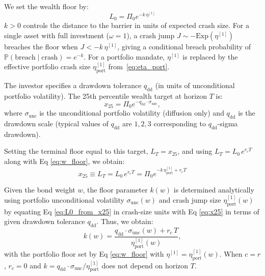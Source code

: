 \documentclass[11pt,a4paper]{article}
\numberwithin{equation}{section}
\newcommand{\Prob}{\mathbb{P}}
\begin{document}
We set the wealth floor by:
\begin{equation}\label{eq:w_floor}
L_0 = \Pi_0 e^{-k\,\eta^{[1]}}
\end{equation}
$k > 0$ controls the distance to the barrier in units of expected 
crash size. For a single asset with full investment ($\omega = 1$), 
a crash jump $J \sim -\mathrm{Exp}(\eta^{[1]})$ breaches the floor 
when $J < -k\,\eta^{[1]}$, giving a conditional breach probability 
of $\Prob(\text{breach} \mid \text{crash}) = e^{-k}$. For a portfolio 
mandate, $\eta^{[1]}$ is replaced by the effective portfolio crash 
size $\eta^{[1]}_{\mathrm{port}}$ from~\eqref{eq:eta_port}. 



The investor specifies a drawdown tolerance $q_{\mathrm{dd}}$ (in units of 
unconditional portfolio volatility). The 25th percentile wealth target at 
horizon $T$ is:
\begin{equation}\label{eq:x25}
x_{25} = \Pi_0 e^{-q_{\mathrm{dd}} \cdot \sigma_{\mathrm{unc}}},
\end{equation}
where $\sigma_{\mathrm{unc}}$ is the unconditional portfolio volatility 
(diffusion only) and $q_{\mathrm{dd}}$ is the drawdown scale (typical values of $q_{\mathrm{dd}}$ are $1, 2, 3$ corresponding to $q_{\mathrm{dd}}$-sigma drawdown).


Setting the terminal floor equal to this target, $L_T = x_{25}$, and 
using $L_T = L_0\, e^{r_c T}$ along with Eq \eqref{eq:w_floor}, we obtain:
\begin{equation}\label{eq:L0_from_x25}
x_{25} \equiv L_T  = L_0\, e^{r_c T} = \Pi_0 e^{-k\,\eta^{[1]}_{\mathrm{port}}+r_c T} 
\end{equation}


Given the bond weight $w$, the floor parameter $k(w)$ is determined analytically using portfolio unconditional volatility $\sigma_{\mathrm{unc}}(w)$ and crash jump size $\eta^{[1]}_{\mathrm{port}}(w)$ by equating Eq \eqref{eq:L0_from_x25} in crash-size units with Eq \eqref{eq:x25} in terms of given drawdown tolerance $q_{\mathrm{dd}}$. Thus, we obtain:
\begin{equation}\label{eq:k_from_x25}
k(w) = \frac{q_{\mathrm{dd}} \cdot \sigma_{\mathrm{unc}}(w) + r_c\, T}
{\eta^{[1]}_{\mathrm{port}}(w)},
\end{equation}
with the portfolio floor set by Eq \eqref{eq:w_floor} with $\eta^{[1]}=\eta^{[1]}_{\mathrm{port}}(w)$. When $c = r$ , $r_c = 0$ and 
$k = q_{\mathrm{dd}} \cdot \sigma_{\mathrm{unc}} / 
\eta^{[1]}_{\mathrm{port}}$ does not depend on horizon $T$.
\end{document}
